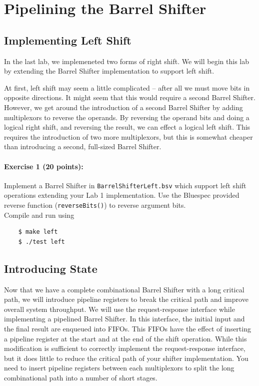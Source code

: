 \documentclass{article}
\begin{document}
\section{Pipelining the Barrel Shifter}

\subsection{Implementing Left Shift}
In the last lab, we implemeneted two forms of right shift. We will begin this lab by extending the
Barrel Shifter implementation to support left shift.

At first, left shift may seem a little complicated – after all we must move bits in opposite
directions. It might seem that this would require a second Barrel Shifter.%
However, we get around the introduction of a second Barrel Shifter by adding multiplexors to reverse the operands.
By reversing the operand bits and doing a logical right shift, and reversing the result, we can effect
a logical left shift. This requires the introduction of two more multiplexors, but this is somewhat
cheaper than introducing a second, full-sized Barrel Shifter.

\paragraph{\bf Exercise 1 (20 points):} Implement a Barrel Shifter in  \texttt{BarrelShifterLeft.bsv} 
which support left shift operations extending your Lab 1 implementation. 
Use the Bluespec provided reverse function (\texttt{reverseBits()}) to reverse argument bits.
\\\indent Compile and run using

\begin{Verbatim}
    $ make left
    $ ./test left
\end{Verbatim}

\subsection{Introducing State}
Now that we have a complete combinational Barrel Shifter with a long critical path, we will introduce
pipeline registers to break the critical path and improve overall system throughput. We will use
the request-response interface while implementing a pipelined Barrel Shifter. In this interface, 
the initial input and the final result are enqueued into FIFOs. This FIFOs have the effect of
inserting a pipeline register at the start and at the end of the shift operation.
While this modification is sufficient to correctly implement the request-response interface, 
but it does little to reduce the critical path of your shifter implementation.
You need to insert pipeline registers between each multiplexors to split the long combinational path into a number of short stages.
\end{document}
